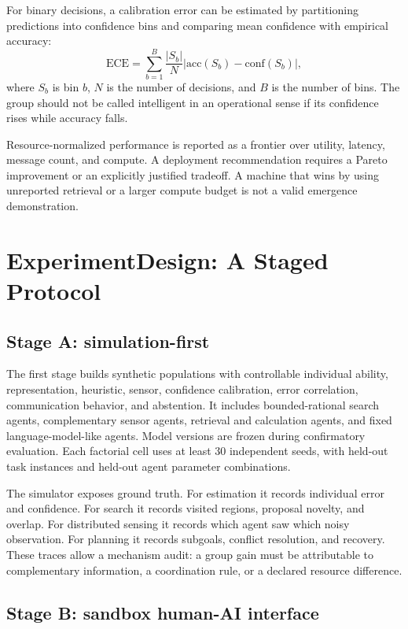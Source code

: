 \documentclass[conference]{IEEEtran}
\begin{document}
For binary decisions, a calibration error can be estimated by partitioning predictions into confidence bins and comparing mean confidence with empirical accuracy:
\begin{equation}
\mathrm{ECE}=\sum_{b=1}^{B}\frac{|S_b|}{N}\left|\mathrm{acc}(S_b)-\mathrm{conf}(S_b)\right|,
\label{eq:calibration}
\end{equation}
where $S_b$ is bin $b$, $N$ is the number of decisions, and $B$ is the number of bins. The group should not be called intelligent in an operational sense if its confidence rises while accuracy falls.

Resource-normalized performance is reported as a frontier over utility, latency, message count, and compute. A deployment recommendation requires a Pareto improvement or an explicitly justified tradeoff. A machine that wins by using unreported retrieval or a larger compute budget is not a valid emergence demonstration.

\section{ExperimentDesign: A Staged Protocol}

\subsection{Stage A: simulation-first}

The first stage builds synthetic populations with controllable individual ability, representation, heuristic, sensor, confidence calibration, error correlation, communication behavior, and abstention. It includes bounded-rational search agents, complementary sensor agents, retrieval and calculation agents, and fixed language-model-like agents. Model versions are frozen during confirmatory evaluation. Each factorial cell uses at least 30 independent seeds, with held-out task instances and held-out agent parameter combinations.

The simulator exposes ground truth. For estimation it records individual error and confidence. For search it records visited regions, proposal novelty, and overlap. For distributed sensing it records which agent saw which noisy observation. For planning it records subgoals, conflict resolution, and recovery. These traces allow a mechanism audit: a group gain must be attributable to complementary information, a coordination rule, or a declared resource difference.

\subsection{Stage B: sandbox human-AI interface}
\end{document}
